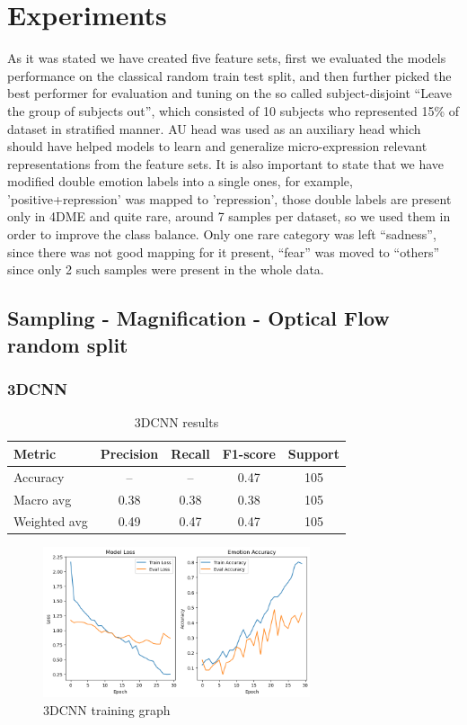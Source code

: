 \documentclass{article}
\begin{document}
\section{Experiments}

As it was stated we have created five feature sets, first we evaluated the models performance on the classical random train test split, and then further picked the best performer for evaluation and tuning on the so called subject-disjoint “Leave the group of subjects out”, which consisted of 10 subjects who represented 15\% of dataset in stratified manner. AU head was used as an auxiliary head which should have helped models to learn and generalize micro-expression relevant representations from the feature sets. It is also important to state that we have modified double emotion labels into a single ones, for example, 'positive+repression' was mapped to 'repression', those double labels are present only in 4DME and quite rare, around 7 samples per dataset, so we used them in order to improve the class balance. Only one rare category was left “sadness”, since there was not good mapping for it present, “fear” was moved to “others” since only 2 such samples were present in the whole data.

\subsection{Sampling - Magnification - Optical Flow random split}
\subsubsection{3DCNN}

\begin{table}[H]
\centering
\caption{3DCNN results}
\begin{tabular}{|l|c|c|c|c|}
\hline
\textbf{Metric} & \textbf{Precision} & \textbf{Recall} & \textbf{F1-score} & \textbf{Support} \\
\hline
Accuracy       & --   & --   & 0.47 & 105 \\
Macro avg      & 0.38 & 0.38 & 0.38 & 105 \\
Weighted avg   & 0.49 & 0.47 & 0.47 & 105 \\
\hline
\end{tabular}%
\label{tab:table1}
\end{table}

\begin{figure}[H]
  \begin{center}
    \includegraphics*[width=0.7\textwidth]{Figures/Picture5.png}
  \end{center}
  \caption{3DCNN training graph}
  \label{fig:fig5}
\end{figure}
\end{document}
